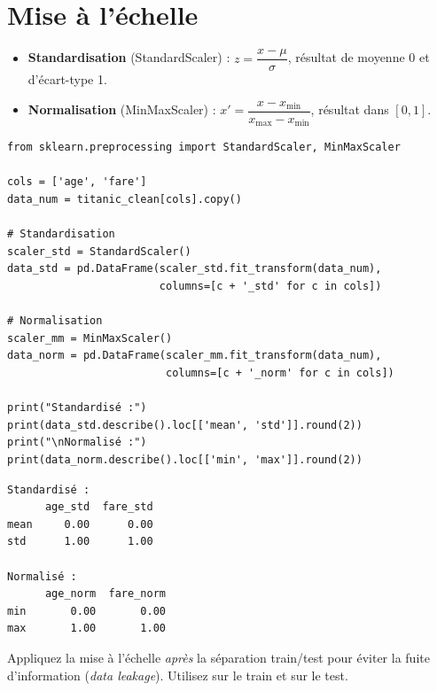 \section{Mise \`a l'\'echelle}

\begin{definition}
\begin{itemize}
    \item \textbf{Standardisation} (StandardScaler) : $z = \dfrac{x - \mu}{\sigma}$, r\'esultat de moyenne 0 et d'\'ecart-type 1.
    \item \textbf{Normalisation} (MinMaxScaler) : $x' = \dfrac{x - x_{\min}}{x_{\max} - x_{\min}}$, r\'esultat dans $[0, 1]$.
\end{itemize}
\end{definition}

\begin{codeblock}[title=\textbf{Python}]
\begin{verbatim}
from sklearn.preprocessing import StandardScaler, MinMaxScaler

cols = ['age', 'fare']
data_num = titanic_clean[cols].copy()

# Standardisation
scaler_std = StandardScaler()
data_std = pd.DataFrame(scaler_std.fit_transform(data_num),
                        columns=[c + '_std' for c in cols])

# Normalisation
scaler_mm = MinMaxScaler()
data_norm = pd.DataFrame(scaler_mm.fit_transform(data_num),
                         columns=[c + '_norm' for c in cols])

print("Standardisé :")
print(data_std.describe().loc[['mean', 'std']].round(2))
print("\nNormalisé :")
print(data_norm.describe().loc[['min', 'max']].round(2))
\end{verbatim}
\end{codeblock}

\begin{codeoutput}
\begin{verbatim}
Standardisé :
      age_std  fare_std
mean     0.00      0.00
std      1.00      1.00

Normalisé :
      age_norm  fare_norm
min       0.00       0.00
max       1.00       1.00
\end{verbatim}
\end{codeoutput}

\begin{bonnepratique}
Appliquez la mise \`a l'\'echelle \emph{apr\`es} la s\'eparation train/test pour \'eviter la fuite d'information (\emph{data leakage}). Utilisez  sur le train et  sur le test.
\end{bonnepratique}

